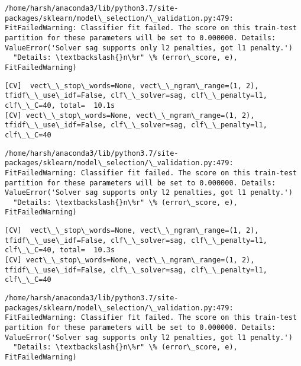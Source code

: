 \documentclass[11pt]{article}
\begin{document}
    \begin{Verbatim}[commandchars=\\\{\}]
/home/harsh/anaconda3/lib/python3.7/site-packages/sklearn/model\_selection/\_validation.py:479: FitFailedWarning: Classifier fit failed. The score on this train-test partition for these parameters will be set to 0.000000. Details: 
ValueError('Solver sag supports only l2 penalties, got l1 penalty.')
  "Details: \textbackslash{}n\%r" \% (error\_score, e), FitFailedWarning)

    \end{Verbatim}

    \begin{Verbatim}[commandchars=\\\{\}]
[CV]  vect\_\_stop\_words=None, vect\_\_ngram\_range=(1, 2), tfidf\_\_use\_idf=False, clf\_\_solver=sag, clf\_\_penalty=l1, clf\_\_C=40, total=  10.1s
[CV] vect\_\_stop\_words=None, vect\_\_ngram\_range=(1, 2), tfidf\_\_use\_idf=False, clf\_\_solver=sag, clf\_\_penalty=l1, clf\_\_C=40 

    \end{Verbatim}

    \begin{Verbatim}[commandchars=\\\{\}]
/home/harsh/anaconda3/lib/python3.7/site-packages/sklearn/model\_selection/\_validation.py:479: FitFailedWarning: Classifier fit failed. The score on this train-test partition for these parameters will be set to 0.000000. Details: 
ValueError('Solver sag supports only l2 penalties, got l1 penalty.')
  "Details: \textbackslash{}n\%r" \% (error\_score, e), FitFailedWarning)

    \end{Verbatim}

    \begin{Verbatim}[commandchars=\\\{\}]
[CV]  vect\_\_stop\_words=None, vect\_\_ngram\_range=(1, 2), tfidf\_\_use\_idf=False, clf\_\_solver=sag, clf\_\_penalty=l1, clf\_\_C=40, total=  10.3s
[CV] vect\_\_stop\_words=None, vect\_\_ngram\_range=(1, 2), tfidf\_\_use\_idf=False, clf\_\_solver=sag, clf\_\_penalty=l1, clf\_\_C=40 

    \end{Verbatim}

    \begin{Verbatim}[commandchars=\\\{\}]
/home/harsh/anaconda3/lib/python3.7/site-packages/sklearn/model\_selection/\_validation.py:479: FitFailedWarning: Classifier fit failed. The score on this train-test partition for these parameters will be set to 0.000000. Details: 
ValueError('Solver sag supports only l2 penalties, got l1 penalty.')
  "Details: \textbackslash{}n\%r" \% (error\_score, e), FitFailedWarning)

    \end{Verbatim}
\end{document}
